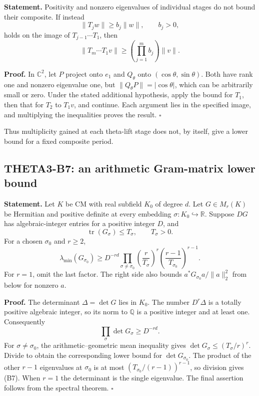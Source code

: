 \documentclass[11pt]{article}
\newcommand{\Q}{\mathbb Q}\newcommand{\C}{\mathbb C}\newcommand{\Z}{\mathbb Z}\newcommand{\R}{\mathbb R}\newcommand{\A}{\mathbb A}\newcommand{\OO}{\mathcal O}
\theoremstyle{definition}\newtheorem{definition}[theorem]{Definition}\newtheorem{remark}[theorem]{Remark}
\begin{document}
\textbf{Statement.} Positivity and nonzero eigenvalues of individual stages do not bound their composite. If instead
\[
 \|T_jw\|\geq b_j\|w\|,\qquad b_j>0,
\]
holds on the image of $T_{j-1}\cdots T_1$, then
\[
 \|T_m\cdots T_1v\|\geq\left(\prod_{j=1}^m b_j\right)\|v\|.
\]

\textbf{Proof.} In $\C^2$, let $P$ project onto $e_1$ and $Q_\theta$ onto $(\cos\theta,\sin\theta)$. Both have rank one and nonzero eigenvalue one, but $\|Q_\theta P\|=|\cos\theta|$, which can be arbitrarily small or zero. Under the stated additional hypothesis, apply the bound for $T_1$, then that for $T_2$ to $T_1v$, and continue. Each argument lies in the specified image, and multiplying the inequalities proves the result. \hfill$\square$

Thus multiplicity gained at each theta-lift stage does not, by itself, give a lower bound for a fixed composite period.

\subsection{THETA3-B7: an arithmetic Gram-matrix lower bound}\label{B7}

\textbf{Statement.} Let $K$ be CM with real subfield $K_0$ of degree $d$. Let $G\in M_r(K)$ be Hermitian and positive definite at every embedding $\sigma:K_0\hookrightarrow\R$. Suppose $DG$ has algebraic-integer entries for a positive integer $D$, and
\[
 \operatorname{tr}(G_\sigma)\leq T_\sigma,\qquad T_\sigma>0.
\]
For a chosen $\sigma_0$ and $r\geq2$,
\[
 \lambda_{\min}(G_{\sigma_0})\geq
 D^{-rd}\prod_{\sigma\ne\sigma_0}\left(\frac r{T_\sigma}\right)^r
       \left(\frac{r-1}{T_{\sigma_0}}\right)^{r-1}.
 \tag{B7}
\]
For $r=1$, omit the last factor. The right side also bounds
$a^*G_{\sigma_0}a/\|a\|_2^2$ from below for nonzero $a$.

\textbf{Proof.} The determinant $\Delta=\det G$ lies in $K_0$. The number $D^r\Delta$ is a totally positive algebraic integer, so its norm to $\Q$ is a positive integer and at least one. Consequently
\[
 \prod_\sigma\det G_\sigma\geq D^{-rd}.
\]
For $\sigma\ne\sigma_0$, the arithmetic--geometric mean inequality gives
$\det G_\sigma\leq(T_\sigma/r)^r$. Divide to obtain the corresponding lower bound for $\det G_{\sigma_0}$. The product of the other $r-1$ eigenvalues at $\sigma_0$ is at most $(T_{\sigma_0}/(r-1))^{r-1}$, so division gives (B7). When $r=1$ the determinant is the single eigenvalue. The final assertion follows from the spectral theorem. \hfill$\square$
\end{document}
